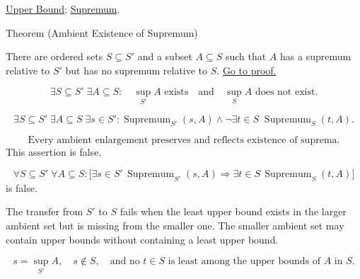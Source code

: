 \begin{dependencies}
\hyperref[def:upper-bound]{Upper Bound};
\hyperref[def:supremum]{Supremum}.
\end{dependencies}


\begin{theorembox}{Theorem (Ambient Existence of Supremum)}
\begin{theorem}
\label{thm:ambient-existence-supremum}
There are ordered sets $S\subseteq S'$ and a subset $A\subseteq S$ such that $A$ has a supremum relative to $S'$ but has no supremum relative to $S$.
\hyperref[prf:ambient-existence-supremum]{Go to proof.}
\end{theorem}
\end{theorembox}

\begin{remark*}
\[
\exists S\subseteq S'\;\exists A\subseteq S:
\quad
\sup_{S'} A\text{ exists}
\quad\text{and}\quad
\sup_S A\text{ does not exist}.
\]
\end{remark*}

\begin{remark*}
\[
\exists S\subseteq S'\;\exists A\subseteq S\;\exists s\in S':
\operatorname{Supremum}_{S'}(s,A)
\land
\neg\exists t\in S\;\operatorname{Supremum}_S(t,A).
\]
\end{remark*}

\begin{remark*}
\[
\text{Every ambient enlargement preserves and reflects existence of suprema.}
\]
This assertion is false.
\end{remark*}

\begin{remark*}
\[
\forall S\subseteq S'\;\forall A\subseteq S:
\bigl[\exists s\in S'\,\operatorname{Supremum}_{S'}(s,A)
\Longrightarrow
\exists t\in S\,\operatorname{Supremum}_S(t,A)\bigr]
\]
is false.
\end{remark*}

\begin{remark*}
The transfer from $S'$ to $S$ fails when the least upper bound exists in the larger ambient set but is missing from the smaller one. The smaller ambient set may contain upper bounds without containing a least upper bound.
\end{remark*}

\begin{remark*}
\[
s=\sup_{S'} A,\quad s\notin S,\quad
\text{and no }t\in S\text{ is least among the upper bounds of }A\text{ in }S.
\]
\end{remark*}

